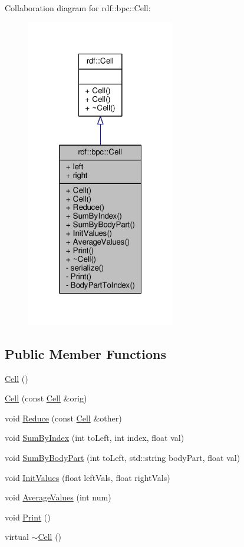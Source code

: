 Collaboration diagram for rdf\+:\+:bpc\+:\+:Cell\+:
\nopagebreak
\begin{figure}[H]
\begin{center}
\leavevmode
\includegraphics[width=184pt]{classrdf_1_1bpc_1_1Cell__coll__graph}
\end{center}
\end{figure}
\subsection*{Public Member Functions}
\begin{DoxyCompactItemize}
\item 
\hyperlink{classrdf_1_1bpc_1_1Cell_a4e55c973f2869d6145b2e4598f73d915}{Cell} ()
\item 
\hyperlink{classrdf_1_1bpc_1_1Cell_afd3bd26a7eaa27e1842a90ee01560833}{Cell} (const \hyperlink{classrdf_1_1bpc_1_1Cell}{Cell} \&orig)
\item 
void \hyperlink{classrdf_1_1bpc_1_1Cell_a163b21f78c2cd0319926292773b68269}{Reduce} (const \hyperlink{classrdf_1_1bpc_1_1Cell}{Cell} \&other)
\item 
void \hyperlink{classrdf_1_1bpc_1_1Cell_a8867ff9846fcd8e0ae6ca0cd754230d1}{Sum\+By\+Index} (int to\+Left, int index, float val)
\item 
void \hyperlink{classrdf_1_1bpc_1_1Cell_a23a09c0ba4e7b6e52176276d464eb982}{Sum\+By\+Body\+Part} (int to\+Left, std\+::string body\+Part, float val)
\item 
void \hyperlink{classrdf_1_1bpc_1_1Cell_ad4ed0c5ddb5690a2a4ea21bb1d897072}{Init\+Values} (float left\+Vals, float right\+Vals)
\item 
void \hyperlink{classrdf_1_1bpc_1_1Cell_ab493e3da763f35681744705d05518412}{Average\+Values} (int num)
\item 
void \hyperlink{classrdf_1_1bpc_1_1Cell_afbdaa564c364a52d937f4474cb37c99a}{Print} ()
\item 
virtual \hyperlink{classrdf_1_1bpc_1_1Cell_a6e00e0aeaca79249ce8d21bee8ca0b62}{$\sim$\+Cell} ()
\end{DoxyCompactItemize}
